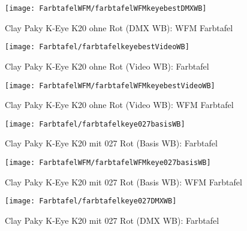 \documentclass[pagesize,paper=A4,fontsize=12pt,utf8,numbers=noenddot,bibliography=totoc,listof=totoc,DIV=11,BCOR=1mm]{scrreprt}
\begin{document}
\begin{figure}[htp]     %
\centering
\texttt{[image: FarbtafelWFM/farbtafelWFMkeyebestDMXWB]} 
\caption {Clay Paky K-Eye K20 ohne Rot (DMX WB): WFM Farbtafel} 
\end{figure}

\begin{figure}[htp]     %
\centering
\texttt{[image: Farbtafel/farbtafelkeyebestVideoWB]} 
\caption {Clay Paky K-Eye K20 ohne Rot (Video WB): Farbtafel} 
\end{figure}

\begin{figure}[htp]     %
\centering
\texttt{[image: FarbtafelWFM/farbtafelWFMkeyebestVideoWB]} 
\caption {Clay Paky K-Eye K20 ohne Rot (Video WB): WFM Farbtafel} 
\end{figure}




\begin{figure}[htp]     %
\centering
\texttt{[image: Farbtafel/farbtafelkeye027basisWB]} 
\caption {Clay Paky K-Eye K20 mit 027 Rot (Basis WB): Farbtafel} 
\end{figure}

\begin{figure}[htp]     %
\centering
\texttt{[image: FarbtafelWFM/farbtafelWFMkeye027basisWB]} 
\caption {Clay Paky K-Eye K20 mit 027 Rot (Basis WB): WFM Farbtafel} 
\end{figure}

\begin{figure}[htp]     %
\centering
\texttt{[image: Farbtafel/farbtafelkeye027DMXWB]} 
\caption {Clay Paky K-Eye K20 mit 027 Rot (DMX WB): Farbtafel} 
\end{figure}
\end{document}
